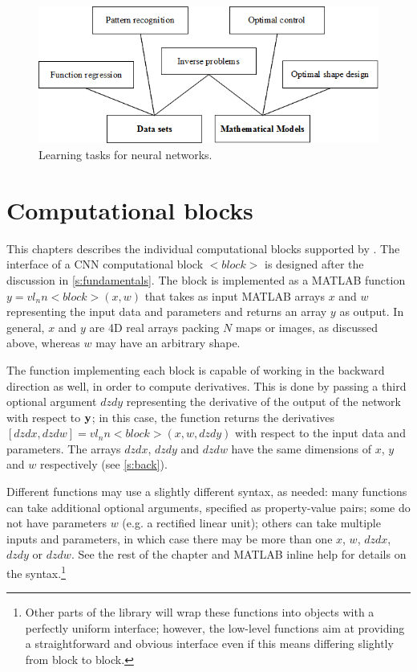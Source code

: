 \begin{figure}[h!]
	\begin{center}
		\includegraphics[width=1.0\textwidth]{neural_networks_basis/learning_tasks}
		\caption{Learning tasks for neural networks.}\label{LearningTasksFigure}
	\end{center}
\end{figure}


\section{Computational blocks}\label{s:blocks}

This chapters describes the individual computational blocks supported by \matconvnet. The interface of a CNN computational block $<block>$ is designed after the discussion in \cref{s:fundamentals}. The block is implemented as a MATLAB function $y = vl_nn<block>(x,w)$ that takes as input MATLAB arrays $x$ and $w$ representing the input data and parameters and returns an array $y$ as output. In general, $x$ and $y$ are 4D real arrays packing $N$ maps or images, as discussed above, whereas $w$ may have an arbitrary shape.

The function implementing each block is capable of working in the backward direction as well, in order to compute derivatives. This is done by passing a third optional argument $dzdy$ representing the derivative of the output of the network with respect to $\mathbf{y}$; in this case, the function returns the derivatives $[dzdx,dzdw] = vl_nn<block>(x,w,dzdy)$ with respect to the input data and parameters. The arrays $dzdx$, $dzdy$ and $dzdw$ have the same dimensions of $x$, $y$ and $w$ respectively (see \cref{s:back}).

Different functions may use a slightly different syntax, as needed: many functions can take additional optional arguments, specified as property-value pairs; some do not have parameters  $w$ (e.g. a rectified linear unit); others can take multiple inputs and parameters, in which case there may be more than one $x$, $w$, $dzdx$, $dzdy$ or $dzdw$. See the rest of the chapter and MATLAB inline help for details on the syntax.\footnote{Other parts of the library will wrap these functions into objects with a perfectly uniform interface; however, the low-level functions aim at providing a straightforward and obvious interface even if this means differing slightly from block to block.}

